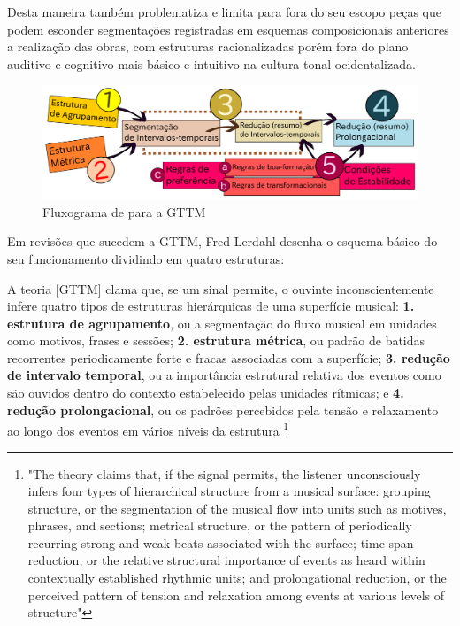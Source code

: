 \documentclass[
	12pt,				%
	openright,			%
	twoside,			%
	a4paper,			%
	english,			%
	french,				%
	spanish,			%
	brazil				%
	]{abntex2}
\begin{document}
Desta maneira também problematiza e limita para fora do seu escopo peças que podem esconder segmentações registradas em esquemas composicionais anteriores a realização das obras, com estruturas racionalizadas porém fora do plano auditivo e cognitivo mais básico e intuitivo na cultura tonal ocidentalizada. 


\begin{figure}[!h]
	\caption{\label{fig_grafico}Fluxograma de  para a GTTM}
	\begin{center}
	    \includegraphics[scale=0.5]{gttm/GTTM_rules.pdf}
	\end{center}
\end{figure}

Em revisões que sucedem a GTTM, Fred Lerdahl desenha o esquema básico do seu funcionamento dividindo em quatro estruturas:

\begin{citacao}
A teoria [GTTM] clama que, se um sinal permite, o ouvinte inconscientemente infere quatro tipos de estruturas hierárquicas de uma superfície musical:\linebreak 
\textbf{1. estrutura de agrupamento}, ou a segmentação do fluxo musical em unidades como motivos, frases e sessões; 
\textbf{2. estrutura métrica}, ou padrão de batidas recorrentes periodicamente forte e fracas associadas com a superfície; 
\textbf{3. redução de intervalo temporal}, ou a importância estrutural relativa dos eventos como são ouvidos dentro do contexto estabelecido pelas unidades rítmicas; e
\textbf{4. redução prolongacional}, ou os padrões percebidos pela tensão e relaxamento ao longo dos eventos em vários níveis da estrutura \cite{lerdahl1992cognitive}
\footnote{
"The theory claims that, if the signal permits, the listener unconsciously infers four types of hierarchical structure from a musical surface: grouping structure, or the segmentation of the musical flow into units such as motives, phrases, and sections; metrical structure, or the pattern of periodically recurring strong and weak beats associated with the surface; time-span reduction, or the relative structural importance of events as heard within contextually established rhythmic units; and prolongational reduction, or the perceived pattern of tension and relaxation among events at various levels of structure"\cite{lerdahl1992cognitive}

}
\end{citacao}
\end{document}
